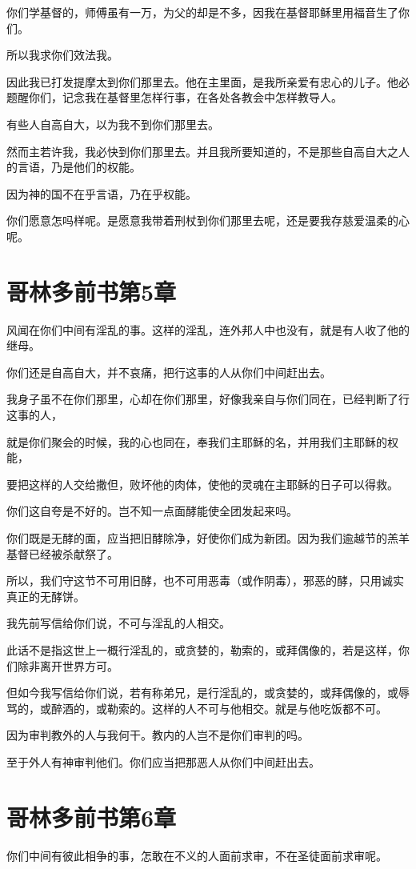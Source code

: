 \documentclass[12pt,oneside]{book}
\begin{document}
你们学基督的，师傅虽有一万，为父的却是不多，因我在基督耶稣里用福音生了你们。

所以我求你们效法我。

因此我已打发提摩太到你们那里去。他在主里面，是我所亲爱有忠心的儿子。他必题醒你们，记念我在基督里怎样行事，在各处各教会中怎样教导人。

有些人自高自大，以为我不到你们那里去。

然而主若许我，我必快到你们那里去。并且我所要知道的，不是那些自高自大之人的言语，乃是他们的权能。

因为神的国不在乎言语，乃在乎权能。

你们愿意怎吗样呢。是愿意我带着刑杖到你们那里去呢，还是要我存慈爱温柔的心呢。

\chapter{哥林多前书第5章}
风闻在你们中间有淫乱的事。这样的淫乱，连外邦人中也没有，就是有人收了他的继母。

你们还是自高自大，并不哀痛，把行这事的人从你们中间赶出去。

我身子虽不在你们那里，心却在你们那里，好像我亲自与你们同在，已经判断了行这事的人，

就是你们聚会的时候，我的心也同在，奉我们主耶稣的名，并用我们主耶稣的权能，

要把这样的人交给撒但，败坏他的肉体，使他的灵魂在主耶稣的日子可以得救。

你们这自夸是不好的。岂不知一点面酵能使全团发起来吗。

你们既是无酵的面，应当把旧酵除净，好使你们成为新团。因为我们逾越节的羔羊基督已经被杀献祭了。

所以，我们守这节不可用旧酵，也不可用恶毒（或作阴毒），邪恶的酵，只用诚实真正的无酵饼。

我先前写信给你们说，不可与淫乱的人相交。

此话不是指这世上一概行淫乱的，或贪婪的，勒索的，或拜偶像的，若是这样，你们除非离开世界方可。

但如今我写信给你们说，若有称弟兄，是行淫乱的，或贪婪的，或拜偶像的，或辱骂的，或醉酒的，或勒索的。这样的人不可与他相交。就是与他吃饭都不可。

因为审判教外的人与我何干。教内的人岂不是你们审判的吗。

至于外人有神审判他们。你们应当把那恶人从你们中间赶出去。

\chapter{哥林多前书第6章}
你们中间有彼此相争的事，怎敢在不义的人面前求审，不在圣徒面前求审呢。
\end{document}
